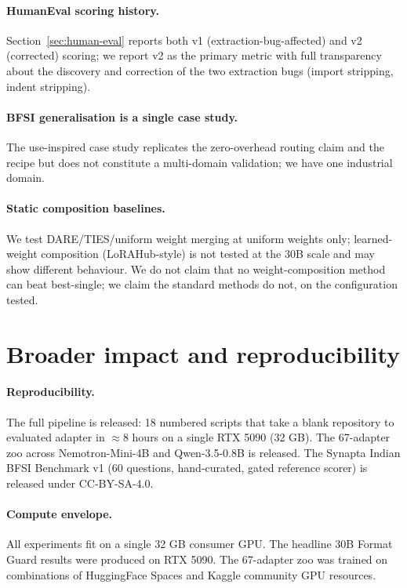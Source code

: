 \documentclass{article}
\begin{document}
\paragraph{HumanEval scoring history.} Section~\ref{sec:human-eval} reports both v1 (extraction-bug-affected) and v2 (corrected) scoring; we report v2 as the primary metric with full transparency about the discovery and correction of the two extraction bugs (import stripping, indent stripping).

\paragraph{BFSI generalisation is a single case study.} The use-inspired case study replicates the zero-overhead routing claim and the recipe but does not constitute a multi-domain validation; we have one industrial domain.

\paragraph{Static composition baselines.} We test DARE/TIES/uniform weight merging at uniform weights only; learned-weight composition (LoRAHub-style) is not tested at the 30B scale and may show different behaviour. We do not claim that no weight-composition method can beat best-single; we claim the standard methods do not, on the configuration tested.


\section{Broader impact and reproducibility}
\label{sec:impact}

\paragraph{Reproducibility.} The full pipeline is released: 18 numbered scripts that take a blank repository to evaluated adapter in $\approx 8$ hours on a single RTX 5090 (32 GB). The 67-adapter zoo across Nemotron-Mini-4B and Qwen-3.5-0.8B is released. The Synapta Indian BFSI Benchmark v1 (60 questions, hand-curated, gated reference scorer) is released under CC-BY-SA-4.0.

\paragraph{Compute envelope.} All experiments fit on a single 32 GB consumer GPU. The headline 30B Format Guard results were produced on RTX 5090. The 67-adapter zoo was trained on combinations of HuggingFace Spaces and Kaggle community GPU resources.
\end{document}
